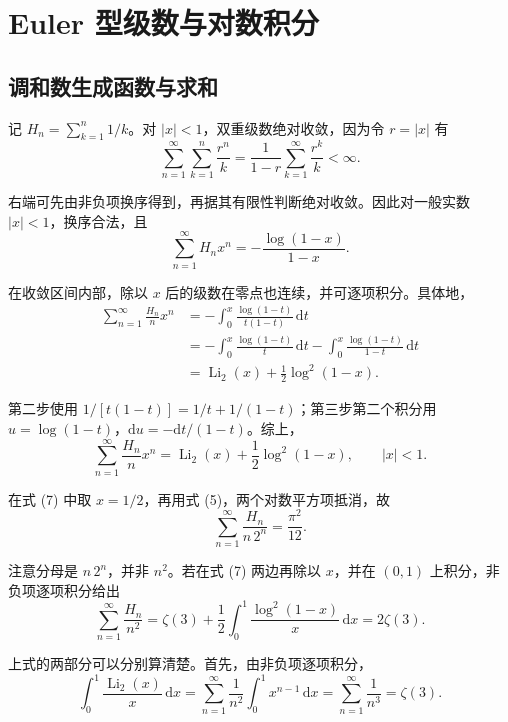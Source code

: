 \documentclass[11pt,a4paper]{article}
\begin{document}
\hypertarget{euler-ux578bux7ea7ux6570ux4e0eux5bf9ux6570ux79efux5206}{%
\section{Euler
型级数与对数积分}\label{euler-ux578bux7ea7ux6570ux4e0eux5bf9ux6570ux79efux5206}}

\hypertarget{ux8c03ux548cux6570ux751fux6210ux51fdux6570ux4e0eux6c42ux548c}{%
\subsection{调和数生成函数与求和}\label{ux8c03ux548cux6570ux751fux6210ux51fdux6570ux4e0eux6c42ux548c}}

记 \(H_n=\sum_{k=1}^n1/k\)。对 \(|x|<1\)，双重级数绝对收敛，因为令
\(r=|x|\) 有
\[
\sum_{n=1}^{\infty}\sum_{k=1}^n\frac{r^n}{k}
=\frac1{1-r}\sum_{k=1}^{\infty}\frac{r^k}{k}<\infty.
\]

右端可先由非负项换序得到，再据其有限性判断绝对收敛。因此对一般实数
\(|x|<1\)，换序合法，且
\[
\sum_{n=1}^{\infty}H_nx^n=-\frac{\log(1-x)}{1-x}.
\]

在收敛区间内部，除以 \(x\) 后的级数在零点也连续，并可逐项积分。具体地，
\[
\begin{aligned}
\sum_{n=1}^{\infty}\frac{H_n}{n}x^n
&=-\int_0^x\frac{\log(1-t)}{t(1-t)}\,\mathrm dt\\
&=-\int_0^x\frac{\log(1-t)}t\,\mathrm dt
-\int_0^x\frac{\log(1-t)}{1-t}\,\mathrm dt\\
&=\operatorname{Li}_2(x)+\frac12\log^2(1-x).
\end{aligned}
\]

第二步使用 \(1/[t(1-t)]=1/t+1/(1-t)\)；第三步第二个积分用
\(u=\log(1-t)\)，\(\mathrm du=-\mathrm dt/(1-t)\)。综上，
\begin{equation}
\sum_{n=1}^{\infty}\frac{H_n}{n}x^n
=\operatorname{Li}_2(x)+\frac12\log^2(1-x),
\qquad |x|<1.
\tag{7}
\end{equation}

在式 (7) 中取 \(x=1/2\)，再用式 (5)，两个对数平方项抵消，故
\[
\sum_{n=1}^{\infty}\frac{H_n}{n\,2^n}=\frac{\pi^2}{12}.
\]

注意分母是 \(n\,2^n\)，并非 \(n^2\)。若在式 (7) 两边再除以 \(x\)，并在
\((0,1)\) 上积分，非负项逐项积分给出
\[
\sum_{n=1}^{\infty}\frac{H_n}{n^2}
=\zeta(3)+\frac12\int_0^1\frac{\log^2(1-x)}x\,\mathrm dx
=2\zeta(3).
\]

上式的两部分可以分别算清楚。首先，由非负项逐项积分，
\[
\int_0^1\frac{\operatorname{Li}_2(x)}x\,\mathrm dx
=\sum_{n=1}^{\infty}\frac1{n^2}\int_0^1x^{n-1}\,\mathrm dx
=\sum_{n=1}^{\infty}\frac1{n^3}=\zeta(3).
\]
\end{document}
